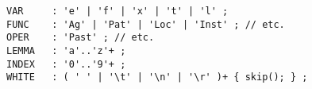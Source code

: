 \documentclass[a4paper, halfparskip, onecolumn, abstracton, final, figurecaptionabove]{scrartcl}
\begin{document}
\begin{figure}

\begin{verbatim}
VAR     : 'e' | 'f' | 'x' | 't' | 'l' ;
FUNC    : 'Ag' | 'Pat' | 'Loc' | 'Inst' ; // etc.
OPER    : 'Past' ; // etc.
LEMMA   : 'a'..'z'+ ;
INDEX   : '0'..'9'+ ;
WHITE   : ( ' ' | '\t' | '\n' | '\r' )+ { skip(); } ;
\end{verbatim}

 \label{antlr-rl-lexer}
\end{figure}

\begin{figure}
\begin{center}
\end{center}
 \label{antlr-tree}
\end{figure}



\end{document}
